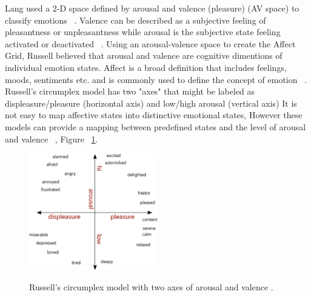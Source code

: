 Lang used a 2-D space defined by arousal and valence (pleasure) (AV space) 
to classify emotions ~\cite{lang1995emotion}. Valence can be
described as a subjective feeling of pleasantness or unpleasantness while 
arousal is the subjective state feeling activated
or deactivated ~\cite{barrett1998discrete}. Using an arousal-valence space to create
the Affect Grid, Russell believed that arousal and valence
are cognitive dimentions of individual emotion states. Affect is a broad definition 
that includes feelings, moods, sentiments etc. and is commonly used to define the concept of
emotion ~\cite{picard2003affective}. Russell's circumplex model has two "axes"
that might be labeled as displeasure/pleasure (horizontal
axis) and low/high arousal (vertical axis) It is not easy to
map affective states into distinctive emotional states, However these models can 
provide a mapping between predefined
states and the level of arousal and valence ~\cite{zagalo2004story}, 
Figure ~\ref{fig:russelavspace}.

\begin{figure}[h!]
  \caption[Russell's arousal and valence model]
  {Russell's circumplex model with two axes of arousal and valence \footnotemark.}
  \centering
  \includegraphics[width=0.5\textwidth]{images/russell-av-space.pdf}
  \label{fig:russelavspace}
\end{figure}


